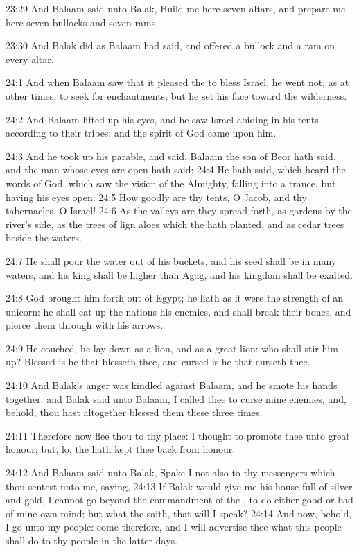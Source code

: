 23:29 And Balaam said unto Balak, Build me here seven altars, and prepare me here seven bullocks and seven rams.

23:30 And Balak did as Balaam had said, and offered a bullock and a ram on every altar.

24:1 And when Balaam saw that it pleased the \LORD to bless Israel, he went not, as at other times, to seek for enchantments, but he set his face toward the wilderness.

24:2 And Balaam lifted up his eyes, and he saw Israel abiding in his tents according to their tribes; and the spirit of God came upon him.

24:3 And he took up his parable, and said, Balaam the son of Beor hath said, and the man whose eyes are open hath said: 24:4 He hath said, which heard the words of God, which saw the vision of the Almighty, falling into a trance, but having his eyes open: 24:5 How goodly are thy tents, O Jacob, and thy tabernacles, O Israel!  24:6 As the valleys are they spread forth, as gardens by the river's side, as the trees of lign aloes which the \LORD hath planted, and as cedar trees beside the waters.

24:7 He shall pour the water out of his buckets, and his seed shall be in many waters, and his king shall be higher than Agag, and his kingdom shall be exalted.

24:8 God brought him forth out of Egypt; he hath as it were the strength of an unicorn: he shall eat up the nations his enemies, and shall break their bones, and pierce them through with his arrows.

24:9 He couched, he lay down as a lion, and as a great lion: who shall stir him up? Blessed is he that blesseth thee, and cursed is he that curseth thee.

24:10 And Balak's anger was kindled against Balaam, and he smote his hands together: and Balak said unto Balaam, I called thee to curse mine enemies, and, behold, thou hast altogether blessed them these three times.

24:11 Therefore now flee thou to thy place: I thought to promote thee unto great honour; but, lo, the \LORD hath kept thee back from honour.

24:12 And Balaam said unto Balak, Spake I not also to thy messengers which thou sentest unto me, saying, 24:13 If Balak would give me his house full of silver and gold, I cannot go beyond the commandment of the \LORD, to do either good or bad of mine own mind; but what the \LORD saith, that will I speak?  24:14 And now, behold, I go unto my people: come therefore, and I will advertise thee what this people shall do to thy people in the latter days.

